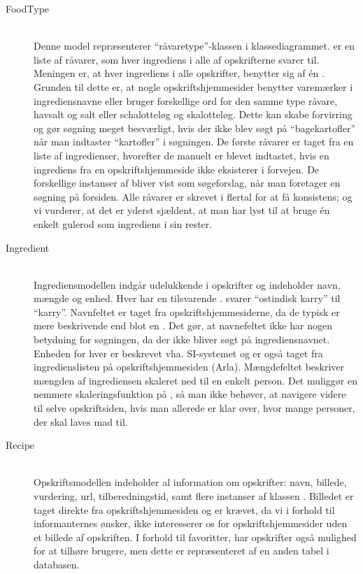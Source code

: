 \begin{description}

  \item[FoodType] \hfill \\
    Denne model repræsenterer ``råvaretype''-klassen i klassediagrammet.  er en liste af råvarer, som hver ingrediens i alle af opskrifterne svarer til. Meningen er, at hver ingrediens i alle opskrifter, benytter sig af én . Grunden til dette er, at nogle opskriftshjemmesider benytter varemærker i ingrediensnavne eller bruger forskellige ord for den samme type råvare, \fx havsalt og salt eller schalotteløg og skalotteløg. Dette kan skabe forvirring og gør søgning meget besværligt, hvis der ikke blev søgt på ``bagekartofler'' når man indtaster ``kartofler'' i søgningen. De første råvarer er taget fra en liste af ingredienser\cite{ingrediensliste}, hvorefter de manuelt er blevet indtastet, hvis en ingrediens fra en opskriftshjemmeside ikke eksisterer i forvejen. De forskellige instanser af  bliver \fx vist som søgeforslag, når man foretager en søgning på forsiden. Alle råvarer er skrevet i flertal for at få konsistens; og vi vurderer, at det er yderst sjældent, at man har lyst til \fx at bruge én enkelt gulerod som ingrediens i sin rester.

  \item[Ingredient] \hfill \\
    Ingrediensmodellen indgår udelukkende i opskrifter og indeholder navn, mængde og enhed. Hver  har en tilsvarende . \Fx svarer ``ostindisk karry'' til ``karry''. Navnfeltet er taget fra opskriftshjemmesiderne, da de typisk er mere beskrivende end blot en . Det gør, at navnefeltet ikke har nogen betydning for søgningen, da der ikke bliver søgt på ingrediensnavnet. Enheden for hver  er beskrevet vha. SI-systemet og er også taget fra ingredienslisten på opskriftshjemmesiden (Arla). Mængdefeltet beskriver mængden af ingrediensen skaleret ned til en enkelt person. Det muliggør en nemmere skaleringsfunktion på \Foodl{}, så man ikke behøver, at navigere videre til selve opskriftsiden, hvis man allerede er klar over, hvor mange personer, der skal laves mad til.

  \item[Recipe] \hfill \\
    Opskriftsmodellen indeholder al information om opskrifter: navn, billede, vurdering, url, tilberedningstid, samt flere instanser af klassen . Billedet er taget direkte fra opskriftshjemmesiden og er krævet, da vi i forhold til informanternes ønsker, ikke interesserer os for opskriftshjemmesider uden et billede af opskriften. I forhold til favoritter, har opskrifter også mulighed for at tilhøre brugere, men dette er repræsenteret af en anden tabel i databasen.  


\end{description}
